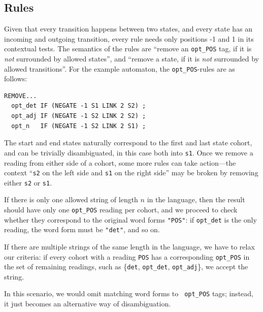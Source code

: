 \documentclass[11pt]{article}
\def\t#1{\texttt{#1}}
\def\h#1{{\tt \color{gray} #1}}
\begin{document}
\subsection{Rules}
Given that every transition happens between two states, and every state 
has an incoming and outgoing transition, every rule needs only
positions -1 and 1 in its contextual tests. 
The semantics of the rules are ``remove an \t{opt\_POS} tag, if it is 
\emph{not} surrounded by allowed states'',
and ``remove a state, if it is \emph{not} surrounded by allowed transitions''.
For the example automaton, the \t{opt\_POS}-rules are as follows:
\begin{verbatim}
REMOVE...
  opt_det IF (NEGATE -1 S1 LINK 2 S2) ;
  opt_adj IF (NEGATE -1 S2 LINK 2 S2) ;
  opt_n   IF (NEGATE -1 S2 LINK 2 S1) ;
\end{verbatim}
The start and end states naturally correspond to the first and last
state cohort, and can be trivially disambiguated, in this case both into \t{s1}.
Once we remove a reading from either side of a cohort, some more rules can take
action---the context ``\t{s2} on the left side and \t{s1} on the right side''
may be broken by removing either \t{s2} or \t{s1}. 

If there is only one allowed string of length $n$ in the language, then the
result should have only one \t{opt\_POS} reading per cohort, and we proceed to
check whether they correspond to the original word forms \t{"POS"}: if
\t{opt\_det} is the only reading, the word form must be \t{"det"}, and so on.

If there are multiple strings of the same length in the language, we have to
relax our criteria: if every cohort with a reading \t{POS} has a corresponding
\t{opt\_POS} in the set of remaining readings, such as \{\t{det}, \t{opt\_det},
\t{opt\_adj}\}, we accept the string.

In this scenario, we would omit matching word forms to \t{\h{opt\_}POS} tags; 
instead, it just becomes an alternative way of disambiguation.
\end{document}

